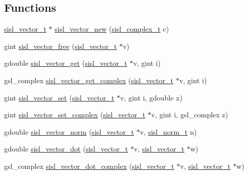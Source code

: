 \subsection*{Functions}
\begin{DoxyCompactItemize}
\item 
\hyperlink{group__vector_gacbac585492f5005f05f0c0b8463039be}{sisl\-\_\-vector\-\_\-t} $\ast$ \hyperlink{group__vector_ga174917724c5ef307cc9d95479e4e9a40}{sisl\-\_\-vector\-\_\-new} (\hyperlink{group__vector_gadbf341f8965fc86dda28912ab5f04930}{sisl\-\_\-complex\-\_\-t} c)
\item 
gint \hyperlink{group__vector_gafedaaf875493835c6ca30030ce1d767a}{sisl\-\_\-vector\-\_\-free} (\hyperlink{group__vector_gacbac585492f5005f05f0c0b8463039be}{sisl\-\_\-vector\-\_\-t} $\ast$v)
\item 
gdouble \hyperlink{group__vector_ga461356df443bbecc3a89173878311f31}{sisl\-\_\-vector\-\_\-get} (\hyperlink{group__vector_gacbac585492f5005f05f0c0b8463039be}{sisl\-\_\-vector\-\_\-t} $\ast$v, gint i)
\item 
gsl\-\_\-complex \hyperlink{group__vector_ga9567ba6afca899f94089827012a933bc}{sisl\-\_\-vector\-\_\-get\-\_\-complex} (\hyperlink{group__vector_gacbac585492f5005f05f0c0b8463039be}{sisl\-\_\-vector\-\_\-t} $\ast$v, gint i)
\item 
gint \hyperlink{group__vector_ga7c5252db656b8e7848ddd754bbe86bee}{sisl\-\_\-vector\-\_\-set} (\hyperlink{group__vector_gacbac585492f5005f05f0c0b8463039be}{sisl\-\_\-vector\-\_\-t} $\ast$v, gint i, gdouble x)
\item 
gint \hyperlink{group__vector_ga4a2722f50dee111ee6f03a5cf28861b1}{sisl\-\_\-vector\-\_\-set\-\_\-complex} (\hyperlink{group__vector_gacbac585492f5005f05f0c0b8463039be}{sisl\-\_\-vector\-\_\-t} $\ast$v, gint i, gsl\-\_\-complex z)
\item 
gdouble \hyperlink{group__vector_ga8275033791c371c8d30bf0abbb05f44a}{sisl\-\_\-vector\-\_\-norm} (\hyperlink{group__vector_gacbac585492f5005f05f0c0b8463039be}{sisl\-\_\-vector\-\_\-t} $\ast$v, \hyperlink{group__vector_gaea7a49b9a1aa9a12bb021ada62a55495}{sisl\-\_\-norm\-\_\-t} n)
\item 
gdouble \hyperlink{group__vector_ga9b8e2a9fbb00ada96f0d327da88f5c64}{sisl\-\_\-vector\-\_\-dot} (\hyperlink{group__vector_gacbac585492f5005f05f0c0b8463039be}{sisl\-\_\-vector\-\_\-t} $\ast$v, \hyperlink{group__vector_gacbac585492f5005f05f0c0b8463039be}{sisl\-\_\-vector\-\_\-t} $\ast$w)
\item 
gsl\-\_\-complex \hyperlink{group__vector_ga6e86d7ca00a219dc151ea78a6c904014}{sisl\-\_\-vector\-\_\-dot\-\_\-complex} (\hyperlink{group__vector_gacbac585492f5005f05f0c0b8463039be}{sisl\-\_\-vector\-\_\-t} $\ast$v, \hyperlink{group__vector_gacbac585492f5005f05f0c0b8463039be}{sisl\-\_\-vector\-\_\-t} $\ast$w)

\end{DoxyCompactItemize}
